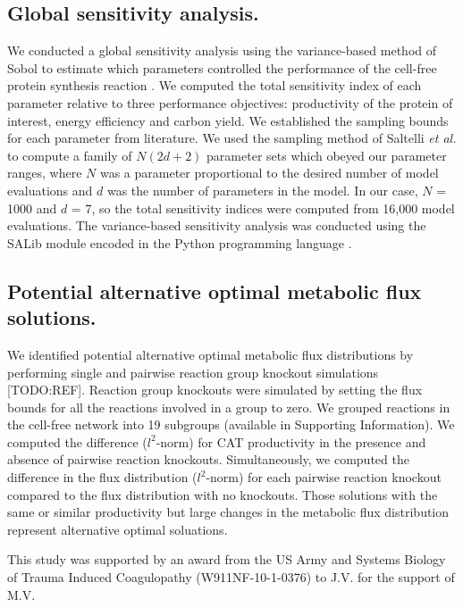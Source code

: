 \documentclass[journal=asbcd6,manuscript=article]{achemso}
\begin{document}
\subsection*{Global sensitivity analysis.}
We conducted a global sensitivity analysis using the variance-based method of Sobol to estimate which parameters controlled the performance of the cell-free protein synthesis reaction \citep{SOBOL_METHOD}.
We computed the total sensitivity index of each parameter relative to three performance objectives: productivity of the protein of interest, energy efficiency and carbon yield.
We established the sampling bounds for each parameter from literature.
We used the sampling method of Saltelli \textit{et al.} \citep{Saltelli:2010} to compute a family of $N\left(2d+2\right)$ parameter sets which obeyed our parameter ranges,
where $N$ was a parameter proportional to the desired number of model evaluations and $d$ was the number of parameters in the model. In our case, $N$ = 1000 and $d$ = 7, so the total sensitivity indices were computed from 16,000 model evaluations. The variance-based sensitivity analysis was conducted using the SALib module encoded in the Python programming language \citep{SALIB}.

\subsection*{Potential alternative optimal metabolic flux solutions.}
We identified potential alternative optimal metabolic flux distributions by performing single and pairwise reaction group knockout simulations [TODO:REF].
Reaction group knockouts were simulated by setting the flux bounds for all the reactions involved in a group to zero.
We grouped reactions in the cell-free network into 19 subgroups (available in Supporting Information).
We computed the difference ($l^{2}$-norm) for CAT productivity in the presence and absence of pairwise reaction knockouts.
Simultaneously, we computed the difference in the flux distribution ($l^{2}$-norm) for each pairwise reaction knockout compared to the flux distribution with no knockouts.
Those solutions with the same or similar productivity but large changes in the metabolic flux distribution represent alternative optimal soluations.

\begin{acknowledgement}

This study was supported by an award from the US Army and Systems Biology of Trauma Induced Coagulopathy (W911NF-10-1-0376) to J.V. for the support of M.V.

\end{acknowledgement}
\end{document}

